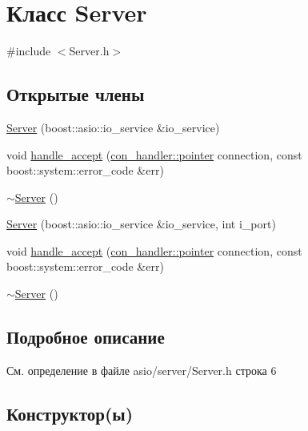 \hypertarget{class_server}{}\section{Класс Server}
\label{class_server}


{\ttfamily \#include $<$Server.\+h$>$}

\subsection*{Открытые члены}
\begin{DoxyCompactItemize}
\item 
\mbox{\hyperlink{class_server_ac9ad7c8bb7fe2f5da5101da1297c9ae1}{Server}} (boost\+::asio\+::io\+\_\+service \&io\+\_\+service)
\item 
void \mbox{\hyperlink{class_server_adb53e5d1b7c0ad8a79ce236c8ca5d50c}{handle\+\_\+accept}} (\mbox{\hyperlink{classcon__handler_ada4a1b970f9fd8e55460a58cf7f7ce2c}{con\+\_\+handler\+::pointer}} connection, const boost\+::system\+::error\+\_\+code \&err)
\item 
\mbox{\hyperlink{class_server_a4b3aa2579cb1c8cd1d069582c14d0fa6}{$\sim$\+Server}} ()
\item 
\mbox{\hyperlink{class_server_a64e726d6d9e85b00ba86488badb330d4}{Server}} (boost\+::asio\+::io\+\_\+service \&io\+\_\+service, int i\+\_\+port)
\item 
void \mbox{\hyperlink{class_server_adb53e5d1b7c0ad8a79ce236c8ca5d50c}{handle\+\_\+accept}} (\mbox{\hyperlink{classcon__handler_ada4a1b970f9fd8e55460a58cf7f7ce2c}{con\+\_\+handler\+::pointer}} connection, const boost\+::system\+::error\+\_\+code \&err)
\item 
\mbox{\hyperlink{class_server_a4b3aa2579cb1c8cd1d069582c14d0fa6}{$\sim$\+Server}} ()
\end{DoxyCompactItemize}


\subsection{Подробное описание}


См. определение в файле asio/server/\+Server.\+h строка 6



\subsection{Конструктор(ы)}
\mbox{\label{class_server_ac9ad7c8bb7fe2f5da5101da1297c9ae1}} 

